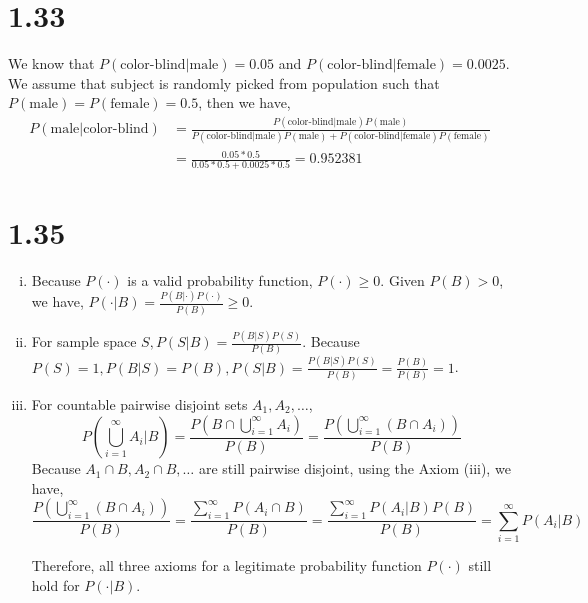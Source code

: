 \documentclass[letter]{article}
\begin{document}

    \section*{1.33}
    We know that $P(\text{color-blind}|\text{male}) = 0.05$ and $P(\text{color-blind}|\text{female}) = 0.0025$. 
    We assume that subject is randomly picked from population such that $P(\text{male}) = P(\text{female}) = 0.5$, then we have,
    \begin{align*}
    P(\text{male}|\text{color-blind}) & = \frac{P(\text{color-blind}|\text{male})P(\text{male})}{P(\text{color-blind}|\text{male})P(\text{male}) + P(\text{color-blind}|\text{female})P(\text{female})} \\ 
    & = \frac{0.05 * 0.5}{0.05*0.5 + 0.0025 * 0.5} = 0.952381
    \end{align*}

    \section*{1.35}
    \begin{enumerate}[(i)]
    \item Because $P(\cdot)$ is a valid probability function, $P(\cdot) \geq 0$. Given $P(B) > 0$, we have, $P(\cdot|B) = \frac{P(B|\cdot)P(\cdot)}{P(B)} \geq 0$. 
    \item For sample space $S, P(S|B) = \frac{P(B|S)P(S)}{P(B)}$. Because $P(S) = 1, P(B|S) = P(B), P(S|B) = \frac{P(B|S)P(S)}{P(B)} = \frac{P(B)}{P(B)} = 1$.
    \item For countable pairwise disjoint sets $A_1, A_2, \dots$, 
    \[
    P\left(\bigcup_{i=1}^{\infty} A_i \lvert B \right) = \frac{P\left(B \cap \bigcup_{i=1}^{\infty} A_i \right)}{P(B)} = \frac{P\left(\bigcup_{i=1}^{\infty} (B \cap A_i) \right)}{P(B)}
    \]
    Because $A_1 \cap B, A_2 \cap B, \dots$ are still pairwise disjoint, using the Axiom (iii), we have,
    \[
    \frac{P\left(\bigcup_{i=1}^{\infty} (B \cap A_i)\right)}{P(B)} = \frac{\sum_{i=1}^{\infty} P(A_i \cap B)}{P(B)} = \frac{\sum_{i=1}^{\infty} P(A_i|B)P(B)}{P(B)} = \sum_{i=1}^{\infty} P(A_i|B)
    \]

    Therefore, all three axioms for a legitimate probability function $P(\cdot)$ still hold for $P(\cdot|B)$.
    \end{enumerate}
\end{document}
